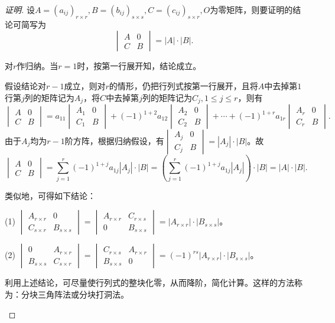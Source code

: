 \documentclass[a4paper]{book}
\newcommand{\enum}{\begin{list}{}{\setlength{\leftmargin}{0pt} \setlength{\itemindent}{2.5em} \setlength{\listparindent}{2em}}}
\begin{document}
\begin{proof}[证明]
设$A=(a_{ij})_{r\times r}, B=(b_{ij})_{s\times s}, C=(c_{ij})_{s\times r}, O$为零矩阵，则要证明的结论可简写为
$$\begin{vmatrix} A & 0 \\ C & B\end{vmatrix} = |A|\cdot|B|.$$

对$r$作归纳。当$r=1$时，按第一行展开知，结论成立。

假设结论对$r-1$成立，则对$r$的情形，仍把行列式按第一行展开，且将$A$中去掉第$1$行第$j$列的矩阵记为$A_j$，将$C$中去掉第$j$列的矩阵记为$C_j, 1 \leqslant j \leqslant r$，则有
$$\begin{vmatrix} A & 0 \\ C & B\end{vmatrix} = a_{11}\begin{vmatrix} A_1 & 0 \\ C_1 & B\end{vmatrix} + (-1)^{1+2}a_{12}\begin{vmatrix} A_2 & 0 \\ C_2 & B\end{vmatrix} + \cdots + (-1)^{1+r}a_{1r}\begin{vmatrix} A_r & 0 \\ C_r & B\end{vmatrix}.$$
由于$A_j$均为$r-1$阶方阵，根据归纳假设，有$\begin{vmatrix} A_j & 0 \\ C_j & B\end{vmatrix} = |A_j|\cdot|B|$。故
$$\begin{vmatrix} A & 0 \\ C & B\end{vmatrix} = \sum\limits_{j=1}^r (-1)^{1+j}a_{1j}|A_j|\cdot|B| = (\sum\limits_{j=1}^r (-1)^{1+j}a_{1j}|A_j|)\cdot|B| = |A|\cdot|B|.$$

类似地，可得如下结论：
\enum
\item[(1)] $\begin{vmatrix} A_{r\times r} & 0 \\ C_{s\times r} & B_{s\times s}\end{vmatrix} = \begin{vmatrix} A_{r\times r} & C_{r\times s} \\ 0 & B_{s\times s}\end{vmatrix} = |A_{r\times r}|\cdot|B_{s\times s}|$。
\item[(2)] $\begin{vmatrix} 0 &  A_{r\times r} \\ B_{s\times s} & C_{s\times r} \end{vmatrix} = \begin{vmatrix} C_{r\times s} & A_{r\times r}  \\ B_{s\times s} & 0 \end{vmatrix} = (-1)^{rs}|A_{r\times r}|\cdot|B_{s\times s}|$。

利用上述结论，可尽量使行列式的整块化零，从而降阶，简化计算。这样的方法称为：分块三角阵法或分块打洞法。
\end{list}
\end{proof}
\end{document}

